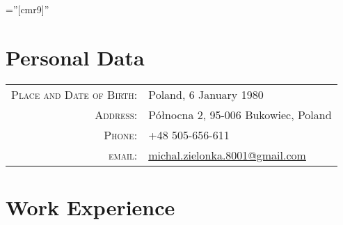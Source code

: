 \documentclass[a4paper,9pt]{article} %
\begin{document}
\pagestyle{empty} %

\font\fb=''[cmr9]'' %


\par{\bigskip\par} %

\section{Personal Data}

\begin{tabular}{rl}
\textsc{Place and Date of Birth:} & Poland, 6 January 1980 \\
\textsc{Address:} & Północna 2, 95-006 Bukowiec, Poland \\
\textsc{Phone:} & +48 505-656-611 \\
\textsc{email:} & \href{mailto:michal.zielonka.8001@gmail.com}{michal.zielonka.8001@gmail.com}
\end{tabular}


\section{Work Experience}
\end{document}
